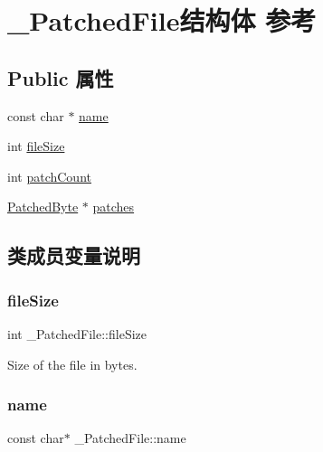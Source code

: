 \hypertarget{struct___patched_file}{}\section{\+\_\+\+Patched\+File结构体 参考}
\label{struct___patched_file}
\subsection*{Public 属性}
\begin{DoxyCompactItemize}
\item 
const char $\ast$ \hyperlink{struct___patched_file_af55908fb40a42ea58278db03c0b2c7a7}{name}
\item 
int \hyperlink{struct___patched_file_a308a1c4f8069544872ac2fc6a1dffb3b}{file\+Size}
\item 
int \hyperlink{struct___patched_file_a7f582540ab5747ff31b2db544dbae9db}{patch\+Count}
\item 
\hyperlink{struct___patched_byte}{Patched\+Byte} $\ast$ \hyperlink{struct___patched_file_a083bafded4ce3f4595e31b76920c7b54}{patches}
\end{DoxyCompactItemize}


\subsection{类成员变量说明}
\mbox{\label{struct___patched_file_a308a1c4f8069544872ac2fc6a1dffb3b}} 
\subsubsection{\texorpdfstring{file\+Size}{fileSize}}
{\footnotesize\ttfamily int \+\_\+\+Patched\+File\+::file\+Size}

Size of the file in bytes. \mbox{\label{struct___patched_file_af55908fb40a42ea58278db03c0b2c7a7}} 
\subsubsection{\texorpdfstring{name}{name}}
{\footnotesize\ttfamily const char$\ast$ \+\_\+\+Patched\+File\+::name}

